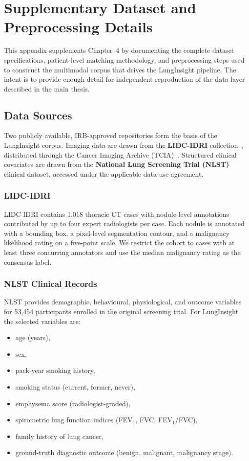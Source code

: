 ﻿\chapter{Supplementary Dataset and Preprocessing Details}
\thispagestyle{empty}

This appendix supplements Chapter~4 by documenting the complete dataset
specifications, patient-level matching methodology, and preprocessing steps
used to construct the multimodal corpus that drives the LungInsight pipeline.
The intent is to provide enough detail for independent reproduction of the
data layer described in the main thesis.

\section{Data Sources}
\label{sec:data-sources}

Two publicly available, IRB-approved repositories form the basis of the
LungInsight corpus. Imaging data are drawn from the
\textbf{LIDC-IDRI} collection~\cite{armato2011lung}, distributed through the
Cancer Imaging Archive (TCIA)~\cite{clark2013cancer}. Structured clinical
covariates are drawn from the \textbf{National Lung Screening Trial
(NLST)}~\cite{national2011reduced} clinical dataset, accessed under the
applicable data-use agreement.

\subsection{LIDC-IDRI}
LIDC-IDRI contains 1{,}018 thoracic CT cases with nodule-level annotations
contributed by up to four expert radiologists per case. Each nodule is
annotated with a bounding box, a pixel-level segmentation contour, and a
malignancy likelihood rating on a five-point scale. We restrict the cohort to
cases with at least three concurring annotators and use the median malignancy
rating as the consensus label.

\subsection{NLST Clinical Records}
NLST provides demographic, behavioural, physiological, and outcome variables
for 53{,}454 participants enrolled in the original screening trial. For
LungInsight the selected variables are:

\begin{itemize}
    \item age (years),
    \item sex,
    \item pack-year smoking history,
    \item smoking status (current, former, never),
    \item emphysema score (radiologist-graded),
    \item spirometric lung function indices (FEV$_1$, FVC, FEV$_1$/FVC),
    \item family history of lung cancer,
    \item ground-truth diagnostic outcome (benign, malignant, malignancy stage).
\end{itemize}

